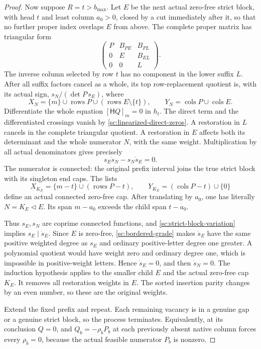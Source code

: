\documentclass[11pt,a4paper]{amsart}
\numberwithin{equation}{section}
\theoremstyle{plain}
\theoremstyle{definition}
\begin{document}
\begin{proof}
Now suppose \(R=t>b_{\max}\).  Let \(E\) be the next actual zero-free
strict block, with head \(t\) and least column \(a_0>0\), closed by a
cut immediately after it, so that no further proper index overlaps
\(E\) from above.  The complete
proper matrix has triangular form
\[
 \begin{pmatrix}
 P&B_{PE}&B_{PL}\\
 0&E&B_{EL}\\
 0&0&L
 \end{pmatrix}.
\]
The inverse column selected by row \(t\) has no component in the
lower suffix \(L\).  After all suffix factors cancel as a whole, its
top row-replacement quotient is, with its actual sign,
\(s_N/(\det P\,s_E)\), where
\[
 X_N=\{m\}\cup\operatorname{rows}P
                 \cup(\operatorname{rows}E\setminus\{t\}),
 \qquad Y_N=\operatorname{cols}P\cup\operatorname{cols}E.
\]
Differentiate the whole equation \([\mathsf HQ]_m=0\) in \(h_t\).
The direct term and the differentiated crossings vanish by
\eqref{sc:linearized-direct-zeros}.  A restoration in \(L\) cancels
in the complete triangular quotient.  A restoration in \(E\) affects
both its determinant and the whole numerator \(N\), with the same
weight.  Multiplication by all actual denominators gives precisely
\begin{equation}\label{sc:strict-block-variation}
 s_E\dot s_N-s_N\dot s_E=0.
\end{equation}
The numerator is connected: the original prefix interval joins the
true strict block with its singleton end caps.  The lists
\[
 X_{K_E}=\{m-t\}\cup(\operatorname{rows}P-t),
 \qquad Y_{K_E}=(\operatorname{cols}P-t)\cup\{0\}
\]
define an actual connected zero-free cap.  After translating by
\(a_0\), one has literally \(N=K_E\triangleleft E\).  Its span
\(m-a_0\) exceeds the child span \(t-a_0\).

Thus \(s_E,s_N\) are coprime connected functions, and
\eqref{sc:strict-block-variation} implies \(s_E\mid\dot s_E\).
Since \(E\) is zero-free, \eqref{sc:bordered-grade} makes
\(\dot s_E\) have the same positive weighted degree as \(s_E\) and
ordinary positive-letter degree one greater.  A polynomial quotient
would have weight zero and ordinary degree one, which is impossible
in positive-weight letters.  Hence \(\dot s_E=0\), and then
\(\dot s_N=0\).  The induction hypothesis applies to the smaller
child \(E\) and the actual zero-free cap \(K_E\).  It removes all
restoration weights in \(E\).  The sorted insertion parity changes
by an even number, so these are the original weights.

Extend the fixed prefix and repeat.  Each remaining vacancy is in
a genuine gap or a genuine strict block, so the process terminates.
Equivalently, at its conclusion \(Q=0\), and
\(Q_b=-\rho_bP_b\) at each previously absent native column forces
every \(\rho_b=0\), because the actual feasible numerator \(P_b\) is
nonzero.
\end{proof}
\end{document}
